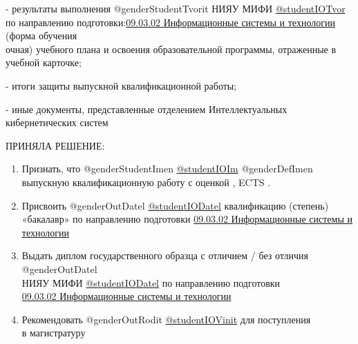 \documentclass[a4paper,12pt]{article} %
\begin{document}
- результаты выполнения @genderStudentTvorit НИЯУ МИФИ \underline{@studentIOTvor}\\
 по направлению подготовки:\underline{09.03.02 Информационные системы и технологии}  (форма обучения\\
  очная) учебного плана и освоения образовательной программы, отраженные в учебной карточке;

- итоги защиты выпускной квалификационной работы;

- иные документы, представленные отделением Интеллектуальных кибернетических систем

\par\medskip

ПРИНЯЛА РЕШЕНИЕ:

\begin{enumerate}
	\item 	Признать, что @genderStudentImen \underline{@studentIOIm} @genderDefImen \\
	выпускную квалификационную работу с оценкой \underline{}, ECTS \underline{}. 
	\vspace{-0.25cm}
	\item 	Присвоить @genderOutDatel \underline{@studentIODatel} квалификацию (степень)\\ 
	«бакалавр» по направлению подготовки \underline{09.03.02 Информационные системы и технологии} 
	\vspace{-0.25cm}
	\item 	Выдать диплом государственного образца с отличием / без отличия @genderOutDatel \\
	НИЯУ МИФИ \underline{@studentIODatel} по направлению подготовки\\
	\underline{09.03.02 Информационные системы и технологии} 
	\vspace{-0.20cm}
	\item 	Рекомендовать @genderOutRodit \underline{@studentIOVinit}  для поступления\\
	 в магистратуру
	\vspace{-0.25cm}
\end{enumerate}
\par\bigskip
\end{document}
